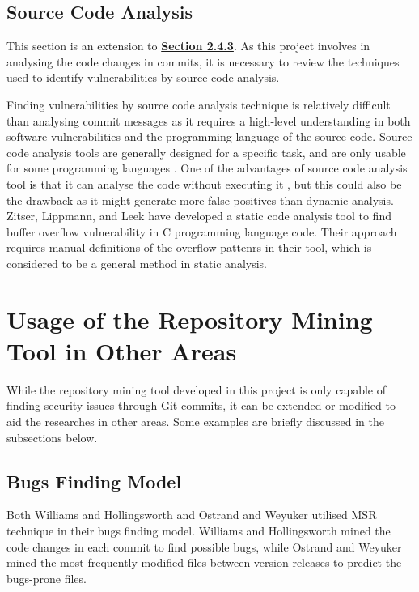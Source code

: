 \documentclass[12pt, a4paper]{report}
\begin{document}
\subsection{Source Code Analysis}
This section is an extension to \hyperref[subsec:finding_vuln]{\textbf{Section 2.4.3}}. As this
project involves in analysing the code changes in commits, it is necessary to review the techniques
used to identify vulnerabilities by source code analysis.

Finding vulnerabilities by source code analysis technique is relatively difficult than analysing
commit messages as it requires a high-level understanding in both software vulnerabilities and the
programming language of the source code. Source code analysis tools are generally designed for a
specific task, and are only usable for some programming languages \cite{antunes_2009}. One of the
advantages of source code analysis tool is that it can analyse the code without executing it
\cite{livshits_finding_2005}, but this could also be the drawback as it might generate more false
positives than dynamic analysis. Zitser, Lippmann, and Leek \cite{zitser_2004} have developed a
static code analysis tool to find buffer overflow vulnerability in C programming language code.
Their approach requires manual definitions of the overflow pattenrs in their tool, which is
considered to be a general method in static analysis. 

\section{Usage of the Repository Mining Tool in Other Areas}
While the repository mining tool developed in this project is only capable of finding security
issues through Git commits, it can be extended or modified to aid the researches in other areas.
Some examples are briefly discussed in the subsections below.

\subsection{Bugs Finding Model}
Both Williams and Hollingsworth \cite{williams_2005} and Ostrand and Weyuker \cite{ostrand_2004}
utilised MSR technique in their bugs finding model. Williams and Hollingsworth mined the code
changes in each commit to find possible bugs, while Ostrand and Weyuker mined the most frequently
modified files between version releases to predict the bugs-prone files.
\end{document}

